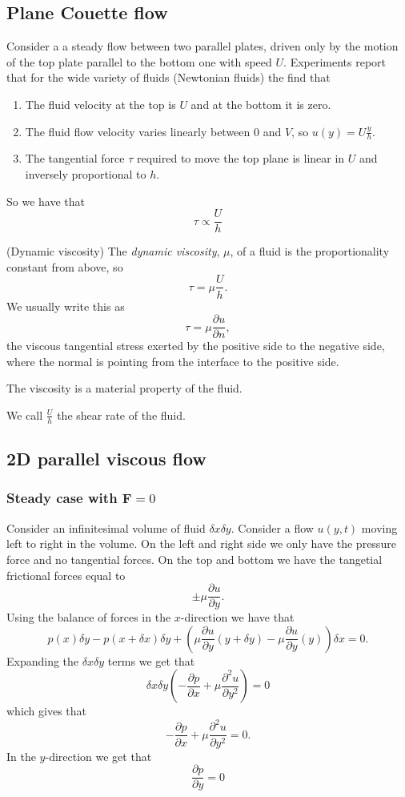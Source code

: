 \documentclass{article}
\begin{document}
\subsection{Plane Couette flow}
Consider a a steady flow between two parallel plates, driven only by the motion of the top plate parallel to the bottom one with speed $ U $. Experiments report that for the wide variety of fluids (Newtonian fluids) the find that
\begin{enumerate}
	\item The fluid velocity at the top is $ U $ and at the bottom it is zero.
	\item The fluid flow velocity varies linearly between $ 0 $ and $ V $, so $ u(y)=U\frac yh $.
	\item The tangential force $ \tau $ required to move the top plane is linear in $ U $ and inversely proportional to $ h $.
\end{enumerate}
So we have that
\[
  \tau \propto \frac Uh
\]
\begin{definition}
	(Dynamic viscosity) The \textit{dynamic viscosity}, $ \mu $, of a fluid is the proportionality constant from above, so
	\[
	  \tau = \mu \frac Uh.
	\]
	We usually write this as
	\[
		\tau = \mu \frac{\partial u}{\partial n},
	\]
	the viscous tangential stress exerted by the positive side to the negative side, where the normal is pointing from the interface to the positive side.
\end{definition}
\begin{remark}
  The viscosity is a material property of the fluid.
\end{remark}
We call $ \frac Uh $ the shear rate of the fluid.
\subsection{2D parallel viscous flow}
\subsubsection{Steady case with $ \mathbf F = 0 $}
Consider an infinitesimal volume of fluid $ \delta x \delta y $. Consider a flow $ u(y,t) $ moving left to right in the volume. On the left and right side we only have the pressure force and no tangential forces. On the top and bottom we have the tangetial frictional forces equal to
\[
	\pm\mu \frac{\partial u}{\partial y}.
\]
Using the balance of forces in the $ x $-direction we have that
\[
	p(x)\delta y - p(x+\delta x) \delta y + \left( \mu \frac{\partial u}{\partial y}(y+\delta y) - \mu \frac{\partial u}{\partial y}(y)\right)\delta x = 0.
\]
Expanding the $ \delta x\delta y $ terms we get that
\[
	\delta x \delta y\left(- \frac{\partial p }{\partial x} + \mu \frac{\partial ^2 u}{\partial y^2}\right) = 0
\]
which gives that
\[
	-\frac{\partial p}{\partial x} + \mu \frac{\partial^2 u}{\partial y^2} = 0.
\]
In the $ y $-direction we get that
\[
	\frac{\partial p}{\partial y}  =0
\]
\end{document}
